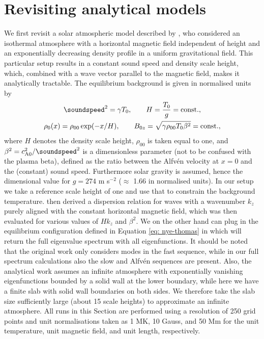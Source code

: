 \section{Revisiting analytical models} \label{sec: analytical_work}
We first revisit a solar atmospheric model described by \citet{nye1976}, who considered an isothermal atmosphere with a horizontal magnetic field independent of height and an exponentially decreasing density profile in a uniform gravitational field. This particular setup results in a constant sound speed and density scale height, which, combined with a wave vector parallel to the magnetic field, makes it analytically tractable. The equilibrium background is given in normalised units by
\begin{equation} \label{eq: nye-thomas}
  \begin{gathered}
    \soundspeed^2 = \gamma T_0,
    \qquad
    H = \frac{T_0}{g} = \text{const.}, \\
    \rho_0(x) = \rho_{00}\exp(-x/H),
    \qquad
    B_{0z} = \sqrt{\gamma \rho_{00}T_0 \beta^2} = \text{const.},
  \end{gathered}
\end{equation}
where $H$ denotes the density scale height, $\rho_{00}$ is taken equal to one, and $\beta^2 = c_\text{A0}^2/\soundspeed^2$ is a dimensionless parameter (not to be confused with the plasma beta), defined as the ratio between the Alfv\'en velocity at $x = 0$ and the (constant) sound speed. Furthermore solar gravity is assumed, hence the dimensional value for $g = 274$ m s$^{-2}$ ($\approx$ 1.66 in normalised units). In our setup we take a reference scale height of one and use that to constrain the background temperature. \citet{nye1976} then derived a dispersion relation for waves with a wavenumber $k_z$ purely aligned with the constant horizontal magnetic field, which was then evaluated for various values of $Hk_z$ and $\beta^2$. We on the other hand can plug in the equilibrium configuration defined in Equation \eqref{eq: nye-thomas} in {\legolas} which will return the full eigenvalue spectrum with all eigenfunctions. It should be noted that the original work only considers modes in the fast sequence, while in our full spectrum calculations also the slow and Alfv\'en sequences are present. Also, the analytical work assumes an infinite atmosphere with exponentially vanishing eigenfunctions bounded by a solid wall at the lower boundary, while here we have a finite slab with solid wall boundaries on both sides. We therefore take the slab size sufficiently large (about 15 scale heights) to approximate an infinite atmosphere. All runs in this Section are performed using a resolution of 250 grid points and unit normalisations taken as 1 MK, 10 Gauss, and 50 Mm for the unit temperature, unit magnetic field, and unit length, respectively.



